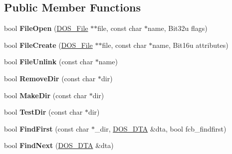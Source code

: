 \subsection*{Public Member Functions}
\begin{DoxyCompactItemize}
\item 
\hypertarget{classVirtual__Drive_acb64173c858c8f3f5f19f367fe77b2a2}{bool {\bfseries File\-Open} (\hyperlink{classDOS__File}{D\-O\-S\-\_\-\-File} $\ast$$\ast$file, const char $\ast$name, Bit32u flags)}\label{classVirtual__Drive_acb64173c858c8f3f5f19f367fe77b2a2}

\item 
\hypertarget{classVirtual__Drive_aa6806dfc623501cde76647cf5196abc7}{bool {\bfseries File\-Create} (\hyperlink{classDOS__File}{D\-O\-S\-\_\-\-File} $\ast$$\ast$file, const char $\ast$name, Bit16u attributes)}\label{classVirtual__Drive_aa6806dfc623501cde76647cf5196abc7}

\item 
\hypertarget{classVirtual__Drive_ada1d71f49420d099757daf52e34fe889}{bool {\bfseries File\-Unlink} (const char $\ast$name)}\label{classVirtual__Drive_ada1d71f49420d099757daf52e34fe889}

\item 
\hypertarget{classVirtual__Drive_a2b89cbb3fe22858a020006a400934ea2}{bool {\bfseries Remove\-Dir} (const char $\ast$dir)}\label{classVirtual__Drive_a2b89cbb3fe22858a020006a400934ea2}

\item 
\hypertarget{classVirtual__Drive_aa32a60de14c7f7f5e03e6475ff1bffd2}{bool {\bfseries Make\-Dir} (const char $\ast$dir)}\label{classVirtual__Drive_aa32a60de14c7f7f5e03e6475ff1bffd2}

\item 
\hypertarget{classVirtual__Drive_a9d3619273e5abe0a84299f082d79485b}{bool {\bfseries Test\-Dir} (const char $\ast$dir)}\label{classVirtual__Drive_a9d3619273e5abe0a84299f082d79485b}

\item 
\hypertarget{classVirtual__Drive_a5b524fed7a4992e9773911b4c3ce6aee}{bool {\bfseries Find\-First} (const char $\ast$\-\_\-dir, \hyperlink{classDOS__DTA}{D\-O\-S\-\_\-\-D\-T\-A} \&dta, bool fcb\-\_\-findfirst)}\label{classVirtual__Drive_a5b524fed7a4992e9773911b4c3ce6aee}

\item 
\hypertarget{classVirtual__Drive_a75726c924866070227a14ab677cab954}{bool {\bfseries Find\-Next} (\hyperlink{classDOS__DTA}{D\-O\-S\-\_\-\-D\-T\-A} \&dta)}\label{classVirtual__Drive_a75726c924866070227a14ab677cab954}


\end{DoxyCompactItemize}
